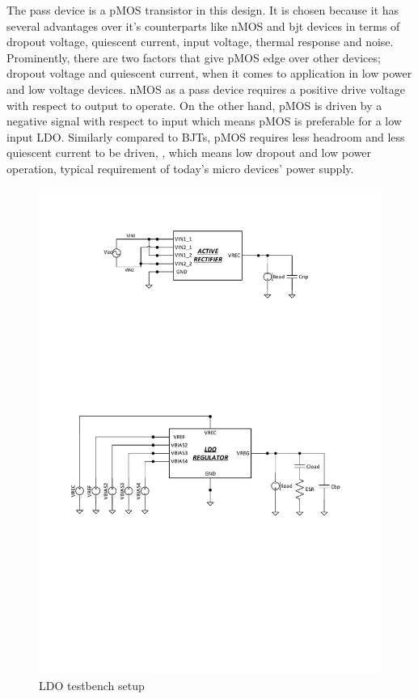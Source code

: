\documentclass[12pt,a4paper,UKenglish]{report}
\begin{document}
The pass device is a pMOS transistor in this design. It is chosen because it has several advantages over it's 
counterparts like nMOS and \acrshort{bjt} devices in terms of dropout voltage, quiescent current, input voltage, thermal 
response and noise\cite{ldo_ti_pmos}. Prominently, there are two factors that give pMOS edge over other devices; 
dropout voltage and quiescent current, when it comes to application in low power and low voltage devices. nMOS as 
a pass device requires a positive drive voltage with respect to output to operate. On the other hand, pMOS is 
driven by a negative signal with respect to input which means pMOS is preferable for a low input LDO. Similarly 
compared to BJTs, pMOS requires less headroom and less quiescent current to be driven\cite{ldo_ti_pmos}, 
\cite{ldo_ti_stability}, which means low dropout and low power operation, typical requirement of today's micro 
devices' power supply. \\

\begin{figure}[htbp] %
   \centering
   \includegraphics[width=1\textwidth]{img/visio/visio_ldo_tb.pdf} 
   \caption{LDO testbench setup}
   \label{fig:ldo_testbench}
\end{figure}
\end{document}
